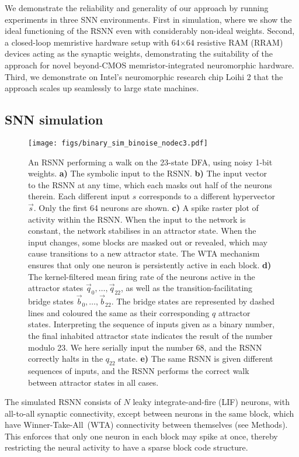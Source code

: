We demonstrate the reliability and generality of our approach by running experiments in three SNN environments. First in simulation, where we show the ideal functioning of the RSNN even with considerably non-ideal weights. Second, a closed-loop memristive hardware setup with 64$\times$64 resistive RAM (RRAM) devices acting as the synaptic weights, demonstrating the suitability of the approach for novel beyond-CMOS memristor-integrated neuromorphic hardware. Third, we demonstrate on Intel's neuromorphic research chip Loihi 2 that the approach scales up seamlessly to large state machines.

\subsection{SNN simulation}



\begin{figure*}
\centering
\texttt{[image: figs/binary\_sim\_binoise\_nodec3.pdf]}
\caption{An RSNN performing a walk on the 23-state DFA, using noisy 1-bit weights. \textbf{a)} The symbolic input to the RSNN.
\textbf{b)} The input vector to the RSNN at any time, which each masks out half of the neurons therein. Each different input $s$ corresponds to a different hypervector $\vec{s}$. Only the first 64 neurons are shown. \textbf{c)} A spike raster plot of activity within the RSNN. When the input to the network is constant, the network stabilises in an attractor state. When the input changes, some blocks are masked out or revealed, which may cause transitions to a new attractor state. The WTA mechanism ensures that only one neuron is persistently active in each block. \textbf{d)} The kernel-filtered mean firing rate of the neurons active in the attractor states $\vec{q}_0, \ldots , \vec{q}_{22}$, as well as the transition-facilitating bridge states $\vec{b}_0, \ldots , \vec{b}_{22}$.
The bridge states are represented by dashed lines and coloured the same as their corresponding $q$ attractor states.
Interpreting the sequence of inputs given as a binary number, the final inhabited attractor state indicates the result of the number modulo 23. We here serially input the number 68, and the RSNN correctly halts in the $q_{22}$ state. \textbf{e)} The same RSNN is given different sequences of inputs, and the RSNN performs the correct walk between attractor states in all cases.}
\label{fig:sim_walk}
\end{figure*}


The simulated RSNN consists of $N$ leaky integrate-and-fire (LIF) neurons, with all-to-all synaptic connectivity, except between neurons in the same block, which have \mbox{Winner-Take-All (WTA)} connectivity between themselves (see Methods). This enforces that only one neuron in each block may spike at once, thereby restricting the neural activity to have a sparse block code structure.

